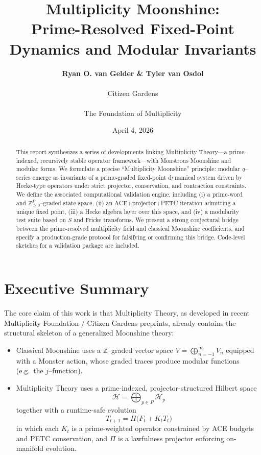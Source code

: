 \documentclass[11pt]{article}
\title{Multiplicity Moonshine:\\
Prime-Resolved Fixed-Point Dynamics and Modular Invariants}
\author{%
  \textbf{Ryan O. van Gelder \& Tyler van Osdol} \\ \\
  Citizen Gardens \\ \\ The Foundation of Multiplicity
}
\date{April 4, 2026}
\theoremstyle{definition}
\theoremstyle{plain}
\theoremstyle{remark}
\newcommand{\Hcal}{\mathcal{H}}
\newcommand{\Zbb}{\mathbb{Z}}
\begin{document}
\maketitle

\begin{abstract}
This report synthesizes a series of developments linking Multiplicity Theory---a prime-indexed, recursively stable operator framework---with Monstrous Moonshine and modular forms.
We formulate a precise ``Multiplicity Moonshine'' principle: modular $q$--series emerge as invariants of a prime-graded fixed-point dynamical system driven by Hecke-type operators under strict projector, conservation, and contraction constraints.
We define the associated computational validation engine, including (i) a prime-word and $\Zbb_{\ge 0}^P$--graded state space, (ii) an ACE+projector+PETC iteration admitting a unique fixed point, (iii) a Hecke algebra layer over this space, and (iv) a modularity test suite based on $S$ and Fricke transforms.
We present a strong conjectural bridge between the prime-resolved multiplicity field and classical Moonshine coefficients, and specify a production-grade protocol for falsifying or confirming this bridge.
Code-level sketches for a validation package are included.
\end{abstract}
\newpage
\tableofcontents
\newpage
\section{Executive Summary}

The core claim of this work is that Multiplicity Theory, as developed in recent Multiplicity Foundation / Citizen Gardens preprints, already contains the structural skeleton of a generalized Moonshine theory:
\begin{itemize}[leftmargin=1.5em]
  \item Classical Moonshine uses a $\Zbb$--graded vector space $V = \bigoplus_{n=-1}^\infty V_n$ equipped with a Monster action, whose graded traces produce modular functions (e.g.\ the $j$--function).
  \item Multiplicity Theory uses a prime-indexed, projector-structured Hilbert space
  \[
    \Hcal = \bigoplus_{p \in P} \Hcal_p
  \]
  together with a runtime-safe evolution
  \[
    T_{t+1} = \Pi\bigl(F_t + K_t T_t\bigr)
  \]
  in which each $K_t$ is a prime-weighted operator constrained by ACE budgets and PETC conservation, and $\Pi$ is a lawfulness projector enforcing on-manifold evolution.
\end{itemize}
\end{document}
